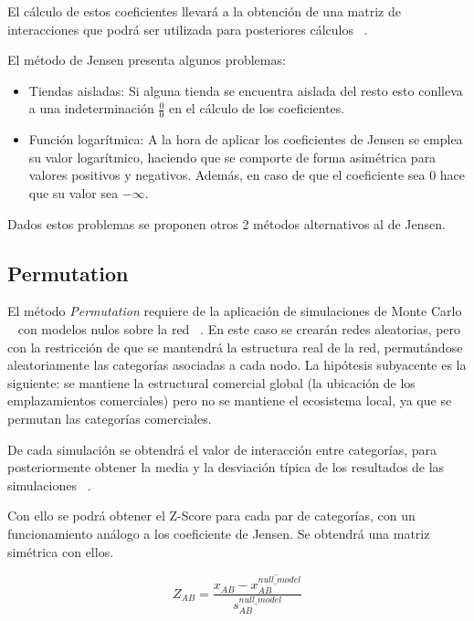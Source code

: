 El cálculo de estos coeficientes llevará a la obtención de una matriz de interacciones que podrá ser utilizada para posteriores cálculos ~\cite{Jensen2006}.

El método de Jensen presenta algunos problemas:

\begin{itemize}
	\item Tiendas aisladas: Si alguna tienda se encuentra aislada del resto esto conlleva a una indeterminación $\frac{0}{0}$ en el cálculo de los coeficientes.
	\item Función logarítmica: A la hora de aplicar los coeficientes de Jensen se emplea su valor logarítmico, haciendo que se comporte de forma asimétrica para valores positivos y negativos. Además, en caso de que el coeficiente sea 0 hace que su valor sea $-\infty$.
\end{itemize}

Dados estos problemas se proponen otros 2 métodos alternativos al de Jensen.
\subsection{Permutation}

El método \textit{Permutation} requiere de la aplicación de simulaciones de Monte Carlo ~\cite{Montecarlo} con modelos nulos sobre la red ~\cite{Ahedo2021,RSVAJSSHJG}. En este caso se crearán redes aleatorias, pero con la restricción de que se mantendrá la estructura real de la red, permutándose aleatoriamente las categorías asociadas a cada nodo. La hipótesis subyacente es la siguiente: se mantiene la estructural comercial global (la ubicación de los emplazamientos comerciales) pero no se mantiene el ecosistema local, ya que se permutan las categorías comerciales.

De cada simulación se obtendrá el valor de interacción entre categorías, para posteriormente obtener la media y la desviación típica de los resultados de las simulaciones ~\cite{Ahedo2021,RSVAJSSHJG}.

Con ello se podrá obtener el Z-Score para cada par de categorías, con un funcionamiento análogo a los coeficiente de Jensen. Se obtendrá una matriz simétrica con ellos.

\begin{equation*}
	Z_{AB} = \frac{x_{AB} - \overline{x_{AB}^{null\_model}}}{s_{AB}^{null\_model}}
\end{equation*}



